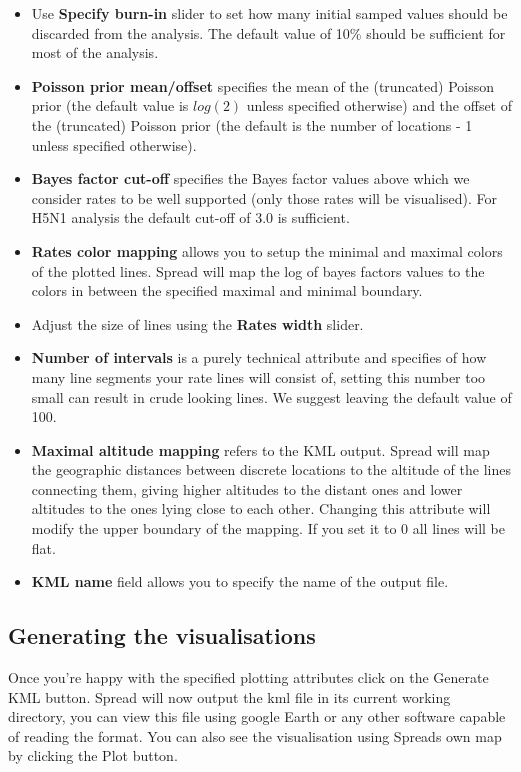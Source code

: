 \begin{itemize}
\item Use \textbf{Specify burn-in} slider to set how many initial samped
values should be discarded from the analysis. The default value of
10\% should be sufficient for most of the analysis.
\item \textbf{Poisson prior mean/offset} specifies the mean of the (truncated)
Poisson prior (the default value is $log(2)$ unless specified otherwise)
and the offset of the (truncated) Poisson prior (the default is the
number of locations - 1 unless specified otherwise).
\item \textbf{Bayes factor cut-off} specifies the Bayes factor values above
which we consider rates to be well supported (only those rates will
be visualised). For H5N1 analysis the default cut-off of 3.0 is sufficient. 
\item \textbf{Rates color mapping} allows you to setup the minimal and maximal
colors of the plotted lines. Spread will map the log of bayes factors
values to the colors in between the specified maximal and minimal
boundary.
\item Adjust the size of lines using the \textbf{Rates width} slider.
\item \textbf{Number of intervals} is a purely technical attribute and specifies
of how many line segments your rate lines will consist of, setting
this number too small can result in crude looking lines. We suggest
leaving the default value of 100.
\item \textbf{Maximal altitude mapping} refers to the KML output. Spread
will map the geographic distances between discrete locations to the
altitude of the lines connecting them, giving higher altitudes to
the distant ones and lower altitudes to the ones lying close to each
other. Changing this attribute will modify the upper boundary of the
mapping. If you set it to 0 all lines will be flat.
\item \textbf{KML name} field allows you to specify the name of the output
file.
\end{itemize}

\subsection{Generating the visualisations}

Once you're happy with the specified plotting attributes click on
the Generate KML button. Spread will now output the kml file in its
current working directory, you can view this file using google Earth
or any other software capable of reading the format. You can also
see the visualisation using Spreads own map by clicking the Plot button.

